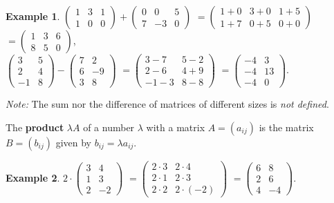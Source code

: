 \documentclass[
  12pt,
  oneside]{book}
\theoremstyle{definition}
\theoremstyle{definition}
\newtheorem{example}{Example}[chapter]
\theoremstyle{definition}
\theoremstyle{definition}
\theoremstyle{remark}
\begin{document}
\begin{example}
\protect\hypertarget{exm:unnamed-chunk-39}{}{\label{exm:unnamed-chunk-39} }\(\begin{pmatrix}1 & 3 & 1\\ 1 & 0 & 0\end{pmatrix}+ \begin{pmatrix}0 & 0 & 5\\ 7 & -3 & 0\end{pmatrix}\)
\(=\begin{pmatrix}1+0&3+0&1+5\\1+7&0+5&0+0\end{pmatrix}\)
\(=\begin{pmatrix}1&3&6\\8&5&0\end{pmatrix}\),\\
\(\begin{pmatrix}3&5\\2&4\\-1&8\end{pmatrix}-\begin{pmatrix}7&2\\6&-9\\3&8\end{pmatrix}\)
\(=\begin{pmatrix}3-7&5-2\\2-6&4+9\\-1-3& 8-8\end{pmatrix}\)
\(=\begin{pmatrix}-4&3\\-4&13\\-4&0\end{pmatrix}\).
\end{example}

\emph{Note:} The sum nor the difference of matrices of different sizes is \emph{not defined}.

The \textbf{product} \(\lambda A\) of a number \(\lambda\) with a matrix \(A=(a_{ij})\) is the matrix \(B=(b_{ij})\) given by \(b_{ij}=\lambda a_{ij}\).

\begin{example}
\protect\hypertarget{exm:unnamed-chunk-40}{}{\label{exm:unnamed-chunk-40} }\(2\cdot \begin{pmatrix} 3 & 4\\ 1 & 3\\ 2 & -2\end{pmatrix}\)
\(=\begin{pmatrix}2\cdot3&2\cdot4\\ 2\cdot1&2\cdot 3\\2\cdot 2&2\cdot(-2)\end{pmatrix}\)
\(=\begin{pmatrix}6&8\\2&6\\4&-4\end{pmatrix}\).
\end{example}
\end{document}
